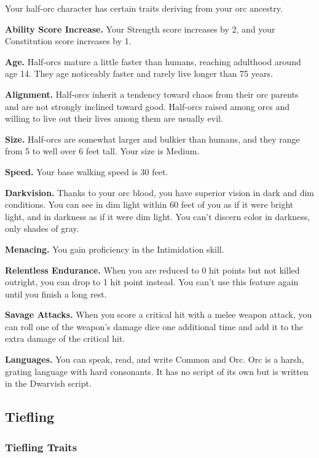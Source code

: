 Your half-orc character has certain traits deriving from your orc
ancestry.

\textbf{Ability Score Increase.} Your Strength score increases by 2, and
your Constitution score increases by 1.

\textbf{Age.} Half-orcs mature a little faster than humans, reaching
adulthood around age 14. They age noticeably faster and rarely live
longer than 75 years.

\textbf{Alignment.} Half-orcs inherit a tendency toward chaos from their
orc parents and are not strongly inclined toward good. Half-orcs raised
among orcs and willing to live out their lives among them are usually
evil.

\textbf{Size.} Half-orcs are somewhat larger and bulkier than humans,
and they range from 5 to well over 6 feet tall. Your size is Medium.

\textbf{Speed.} Your base walking speed is 30 feet.

\textbf{Darkvision.} Thanks to your orc blood, you have superior vision
in dark and dim conditions. You can see in dim light within 60 feet of
you as if it were bright light, and in darkness as if it were dim light.
You can't discern color in darkness, only shades of gray.

\textbf{Menacing.} You gain proficiency in the Intimidation skill.

\textbf{Relentless Endurance.} When you are reduced to 0 hit points but
not killed outright, you can drop to 1 hit point instead. You can't use
this feature again until you finish a long rest.

\textbf{Savage Attacks.} When you score a critical hit with a melee
weapon attack, you can roll one of the weapon's damage dice one
additional time and add it to the extra damage of the critical hit.

\textbf{Languages.} You can speak, read, and write Common and Orc. Orc
is a harsh, grating language with hard consonants. It has no script of
its own but is written in the Dwarvish script.

\hypertarget{tiefling}{%
\subsection{Tiefling}\label{tiefling}}

\hypertarget{tiefling-traits}{%
\subsubsection{Tiefling Traits}\label{tiefling-traits}}

